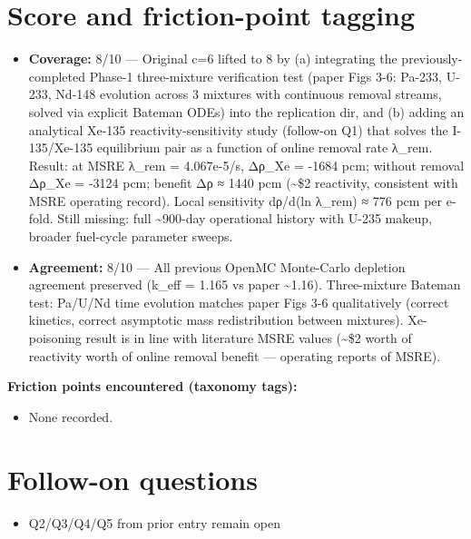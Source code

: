 \documentclass[11pt]{article}
\begin{document}
\section{Score and friction-point tagging}\label{sec:friction}
\begin{itemize}
\item \textbf{Coverage:} 8/10 --- Original c=6 lifted to 8 by (a) integrating the previously-completed Phase-1 three-mixture verification test (paper Figs 3-6: Pa-233, U-233, Nd-148 evolution across 3 mixtures with continuous removal streams, solved via explicit Bateman ODEs) into the replication dir, and (b) adding an analytical Xe-135 reactivity-sensitivity study (follow-on Q1) that solves the I-135/Xe-135 equilibrium pair as a function of online removal rate λ\_rem. Result: at MSRE λ\_rem = 4.067e-5/s, Δρ\_Xe = -1684 pcm; without removal Δρ\_Xe = -3124 pcm; benefit Δρ ≈ 1440 pcm (\textasciitilde{}\$2 reactivity, consistent with MSRE operating record). Local sensitivity dρ/d(ln λ\_rem) ≈ 776 pcm per e-fold. Still missing: full \textasciitilde{}900-day operational history with U-235 makeup, broader fuel-cycle parameter sweeps.
\item \textbf{Agreement:} 8/10 --- All previous OpenMC Monte-Carlo depletion agreement preserved (k\_eff = 1.165 vs paper \textasciitilde{}1.16). Three-mixture Bateman test: Pa/U/Nd time evolution matches paper Figs 3-6 qualitatively (correct kinetics, correct asymptotic mass redistribution between mixtures). Xe-poisoning result is in line with literature MSRE values (\textasciitilde{}\$2 worth of reactivity worth of online removal benefit — operating reports of MSRE).
\end{itemize}

\noindent\textbf{Friction points encountered (taxonomy tags):}
\begin{itemize}
\item None recorded.
\end{itemize}

\section{Follow-on questions}
\begin{itemize}
\item Q2/Q3/Q4/Q5 from prior entry remain open
\end{itemize}
\end{document}
